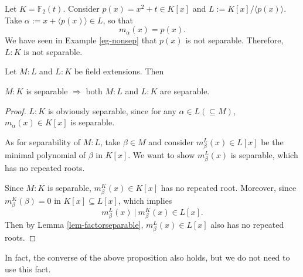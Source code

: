 \begin{example} Let $K = \mathbb{F}_2(t)$. Consider $p(x) = x^2 + t \in K[x]$ and $L := K[x]/\langle p(x) \rangle$. 
Take $\alpha := x + \langle p(x) \rangle \in L$, so that 
$$m_{\alpha}(x) = p(x).$$
We have seen in Example \ref{eg-nonsep} that $p(x)$ is not separable. Therefore, $L:K$ is not separable. 
\end{example}






\begin{proposition}
Let $M:L$ and $L:K$ be field extensions. Then 
\begin{center}
$M:K$ is separable \quad $\Rightarrow$ \quad  both $M:L$ and $L:K$ are separable.    
\end{center}
\end{proposition} 

\begin{proof}
\(L:K\) is obviously separable, since for any \(\alpha \in L(\subseteq M)\), \(m_\alpha(x) \in K[x]\) is separable.

As for separability of \(M:L\), take \(\beta \in M\) and consider \(m_\beta^L(x) \in L[x]\) be the minimal polynomial of \(\beta\) in \(K[x]\). We want to show \(m_\beta^L(x)\) is separable, which has no repeated roots.

Since \(M:K\) is separable, \(m_\beta^K(x) \in K[x]\) has no repeated root. Moreover, since \(m_\beta^K(\beta)  = 0\) in \(K[x] \subseteq L[x]\), which implies \[m_\beta^L(x )\ |\ m_\beta^K(x) \in L[x].\] 
Then by Lemma \ref{lem-factorseparable}, \(m_\beta^L(x) \in L[x]\) also has no repeated roots.
\end{proof}
In fact, the converse of the above proposition also holds, but we do not need to use this fact.
    



